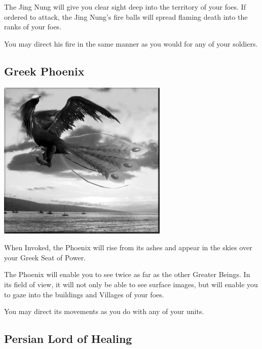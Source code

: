 The Jing Nung will give you clear sight deep into the territory of your foes. If ordered to attack, the Jing Nung’s fire balls will spread flaming death into the ranks of your foes.

You may direct his fire in the same manner as you would for any of your soldiers.

\subsection{Greek Phoenix}

\begin{center}
	\includegraphics[width=1\linewidth]{Aphoenix}
\end{center}

When Invoked, the Phoenix will rise from its ashes and appear in the skies over your Greek Seat of Power.

The Phoenix will enable you to see twice as far as the other Greater Beings. In its field of view, it will not only be able to see surface images, but will enable you to gaze into the buildings and Villages of your foes.

You may direct its movements as you do with any of your units.

\subsection{Persian Lord of Healing}

